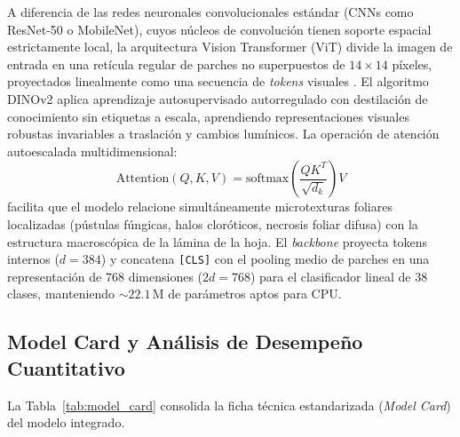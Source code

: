\documentclass[12pt,letterpaper]{article}
\begin{document}
A diferencia de las redes neuronales convolucionales estándar (CNNs como ResNet-50 o MobileNet), cuyos núcleos de convolución tienen soporte espacial estrictamente local, la arquitectura Vision Transformer (ViT) divide la imagen de entrada en una retícula regular de parches no superpuestos de $14 \times 14$ píxeles, proyectados linealmente como una secuencia de \textit{tokens} visuales \cite{dosovitskiy2020image}. El algoritmo DINOv2 aplica aprendizaje autosupervisado autorregulado con destilación de conocimiento sin etiquetas a escala, aprendiendo representaciones visuales robustas invariables a traslación y cambios lumínicos. La operación de atención autoescalada multidimensional:
\begin{equation}
\text{Attention}(Q, K, V) = \text{softmax}\left(\frac{QK^T}{\sqrt{d_k}}\right)V
\end{equation}
facilita que el modelo relacione simultáneamente microtexturas foliares localizadas (pústulas fúngicas, halos cloróticos, necrosis foliar difusa) con la estructura macroscópica de la lámina de la hoja. El \textit{backbone} proyecta tokens internos ($d = 384$) y concatena \texttt{[CLS]} con el pooling medio de parches en una representación de $768$ dimensiones ($2d = 768$) para el clasificador lineal de 38 clases, manteniendo $\sim 22.1$\,M de parámetros aptos para CPU.

\subsection{Model Card y Análisis de Desempeño Cuantitativo}
La Tabla~\ref{tab:model_card} consolida la ficha técnica estandarizada (\textit{Model Card}) del modelo integrado.
\end{document}
